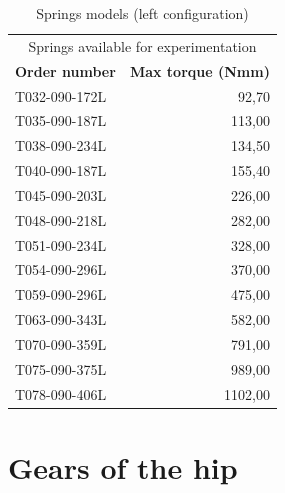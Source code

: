 \begin{appendices}
        \begin{table}[htbp]
        \caption{Springs models (left configuration)}
        \centering
        \begin{tabular}{l|r}
        \multicolumn{2}{c}{\Large Springs available for experimentation} \\
        \multicolumn{1}{c}{\textbf{Order number}} & \multicolumn{1}{c|}{\textbf{Max torque (Nmm)}} \\ \hline
        T032-090-172L & 92,70   \\ \hline
        T035-090-187L & 113,00  \\ \hline
        T038-090-234L  & 134,50 \\ \hline
        T040-090-187L & 155,40  \\ \hline
        T045-090-203L & 226,00  \\ \hline
        T048-090-218L & 282,00  \\ \hline
        T051-090-234L & 328,00  \\ \hline
        T054-090-296L & 370,00  \\ \hline
        T059-090-296L & 475,00  \\ \hline
        T063-090-343L & 582,00  \\ \hline
        T070-090-359L & 791,00  \\ \hline
        T075-090-375L & 989,00  \\ \hline
        T078-090-406L & 1102,00 \\ 
        \end{tabular}
        \label{tab:material_cost}
        \end{table}


    \section{Gears of the hip}
    \label{app:hip_gears}


\end{appendices}

